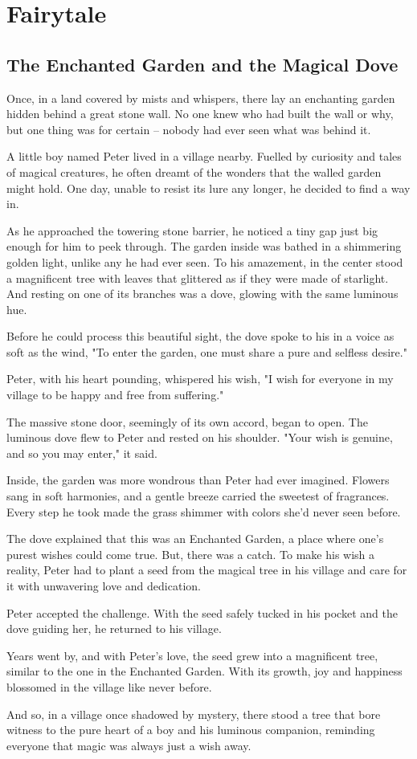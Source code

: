\documentclass[10pt, a4paper, titlepage]{article}
\begin{document}
\newpage
\section{Fairytale}
\subsection*{The Enchanted Garden and the Magical Dove}

Once, in a land covered by mists and whispers, there lay an enchanting garden hidden behind a great stone wall. No one knew who had built the wall or why, but one thing was for certain – nobody had ever seen what was behind it.

A little boy named Peter lived in a village nearby. Fuelled by curiosity and tales of magical creatures, he often dreamt of the wonders that the walled garden might hold. One day, unable to resist its lure any longer, he decided to find a way in.

As he approached the towering stone barrier, he noticed a tiny gap just big enough for him to peek through. The garden inside was bathed in a shimmering golden light, unlike any he had ever seen. To his amazement, in the center stood a magnificent tree with leaves that glittered as if they were made of starlight. And resting on one of its branches was a dove, glowing with the same luminous hue.

Before he could process this beautiful sight, the dove spoke to his in a voice as soft as the wind, "To enter the garden, one must share a pure and selfless desire."

Peter, with his heart pounding, whispered his wish, "I wish for everyone in my village to be happy and free from suffering."

The massive stone door, seemingly of its own accord, began to open. The luminous dove flew to Peter and rested on his shoulder. "Your wish is genuine, and so you may enter," it said.

Inside, the garden was more wondrous than Peter had ever imagined. Flowers sang in soft harmonies, and a gentle breeze carried the sweetest of fragrances. Every step he took made the grass shimmer with colors she'd never seen before.

The dove explained that this was an Enchanted Garden, a place where one’s purest wishes could come true. But, there was a catch. To make his wish a reality, Peter had to plant a seed from the magical tree in his village and care for it with unwavering love and dedication.

Peter accepted the challenge. With the seed safely tucked in his pocket and the dove guiding her, he returned to his village.

Years went by, and with Peter's love, the seed grew into a magnificent tree, similar to the one in the Enchanted Garden. With its growth, joy and happiness blossomed in the village like never before.

And so, in a village once shadowed by mystery, there stood a tree that bore witness to the pure heart of a boy and his luminous companion, reminding everyone that magic was always just a wish away.
\end{document}
